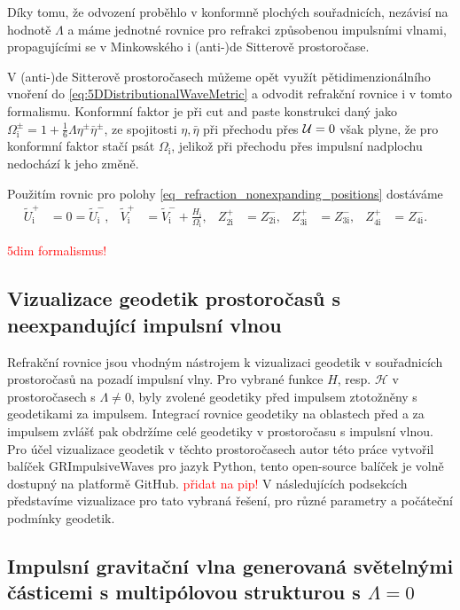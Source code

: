 Díky tomu, že odvození proběhlo v konformně plochých souřadnicích, nezávisí na hodnotě $\Lambda$ a máme jednotné rovnice pro
refrakci způsobenou impulsními vlnami, propagujícími se v Minkowského i (anti-)de Sitterově prostoročase.

V (anti-)de Sitterově prostoročasech můžeme opět využít pětidimenzionálního vnoření do \eqref{eq:5DDistributionalWaveMetric} a odvodit refrakční rovnice
i v tomto formalismu. Konformní faktor je při cut and paste konstrukci daný jako
$\Omega^{\pm}_{\mathrm{i}} = 1 + \frac{1}{6} \Lambda \eta^{\pm} \bar{\eta}^{\pm}$, ze spojitosti $\eta, \bar{\eta}$ při přechodu přes $\mathcal{U}=0$
však plyne, že pro konformní faktor stačí psát $\Omega_{\mathrm{i}}$, jelikož při přechodu přes impulsní nadplochu nedochází k jeho změně.

Použitím rovnic pro polohy \eqref{eq_refraction_nonexpanding_positions} dostáváme
\begin{align}
        \tilde{U}^{+}_\mathrm{i} &= 0 = \tilde{U}^{-}_\mathrm{i}, &
        \tilde{V}^{+}_\mathrm{i} &= \tilde{V}^{-}_\mathrm{i} + \frac{H_\mathrm{i}}{\Omega_\mathrm{i}}, &
        Z^{+}_{2\mathrm{i}} &= Z^{-}_{2\mathrm{i}}, &
        Z^{+}_{3\mathrm{i}} &= Z^{-}_{3\mathrm{i}}, &
        Z^{+}_{4\mathrm{i}} &= Z^{-}_{4\mathrm{i}}.  &
\end{align}


\textcolor{red}{5dim formalismus!}

\subsection{Vizualizace geodetik prostoročasů s neexpandující impulsní vlnou}
Refrakční rovnice jsou vhodným nástrojem k vizualizaci geodetik v souřadnicích prostoročasů na pozadí impulsní vlny.
Pro vybrané funkce $H$, resp. $\mathcal{H}$ v prostoročasech s $\Lambda \neq 0$, byly zvolené geodetiky před impulsem ztotožněny
s geodetikami za impulsem. Integrací rovnice geodetiky na oblastech před a za impulsem zvlášť pak obdržíme celé geodetiky v prostoročasu s
impulsní vlnou. Pro účel vizualizace geodetik v těchto prostoročasech autor této práce vytvořil balíček GRImpulsiveWaves pro jazyk Python,
tento open-source balíček je volně dostupný na platformě GitHub. \textcolor{red}{přidat na pip!} V následujících podsekcích
představíme vizualizace pro tato vybraná řešení, pro různé parametry a počáteční podmínky geodetik.

\subsection{Impulsní gravitační vlna generovaná světelnými částicemi s multipólovou strukturou s $\Lambda=0$}

